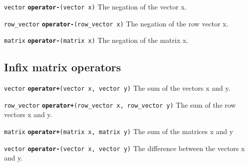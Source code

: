 \documentclass[
  10pt,
]{book}
\begin{document}

\texttt{vector} \textbf{\texttt{operator-}}\texttt{(vector\ x)}\newline
The negation of the vector x.


\texttt{row\_vector} \textbf{\texttt{operator-}}\texttt{(row\_vector\ x)}\newline
The negation of the row vector x.


\texttt{matrix} \textbf{\texttt{operator-}}\texttt{(matrix\ x)}\newline
The negation of the matrix x.

\hypertarget{infix-matrix-operators}{%
\subsection{Infix matrix operators}\label{infix-matrix-operators}}


\texttt{vector} \textbf{\texttt{operator+}}\texttt{(vector\ x,\ vector\ y)}\newline
The sum of the vectors x and y.


\texttt{row\_vector} \textbf{\texttt{operator+}}\texttt{(row\_vector\ x,\ row\_vector\ y)}\newline
The sum of the row vectors x and y.


\texttt{matrix} \textbf{\texttt{operator+}}\texttt{(matrix\ x,\ matrix\ y)}\newline
The sum of the matrices x and y


\texttt{vector} \textbf{\texttt{operator-}}\texttt{(vector\ x,\ vector\ y)}\newline
The difference between the vectors x and y.

\end{document}
